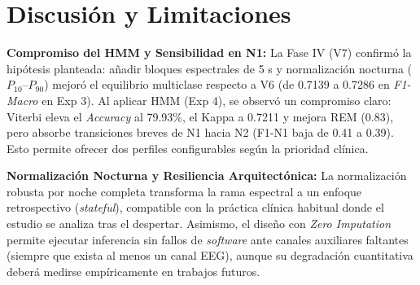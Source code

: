 \documentclass[conference]{IEEEtran}
\begin{document}
\begin{table}[htbp]
\centering
\caption{Referencia Contextual frente al Estado del Arte en \textit{Sleep-EDF} (Protocolos No Equivalentes)}
\label{tab:sota_comparison}
\end{table}

\section{Discusión y Limitaciones}
\textbf{Compromiso del HMM y Sensibilidad en N1:}
La Fase IV (V7) confirmó la hipótesis planteada: añadir bloques espectrales de 5 s y normalización nocturna ($P_{10}$--$P_{90}$) mejoró el equilibrio multiclase respecto a V6 (de 0.7139 a 0.7286 en \textit{F1-Macro} en Exp 3). Al aplicar HMM (Exp 4), se observó un compromiso claro: Viterbi eleva el \textit{Accuracy} al 79.93\%, el Kappa a 0.7211 y mejora REM (0.83), pero absorbe transiciones breves de N1 hacia N2 (F1-N1 baja de 0.41 a 0.39). Esto permite ofrecer dos perfiles configurables según la prioridad clínica.

\textbf{Normalización Nocturna y Resiliencia Arquitectónica:}
La normalización robusta por noche completa transforma la rama espectral a un enfoque retrospectivo (\textit{stateful}), compatible con la práctica clínica habitual donde el estudio se analiza tras el despertar. Asimismo, el diseño con \textit{Zero Imputation} permite ejecutar inferencia sin fallos de \textit{software} ante canales auxiliares faltantes (siempre que exista al menos un canal EEG), aunque su degradación cuantitativa deberá medirse empíricamente en trabajos futuros.
\end{document}
